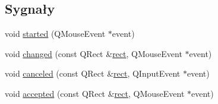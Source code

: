 \subsection*{Sygnały}
\begin{DoxyCompactItemize}
\item 
void \hyperlink{class_q_c_p_selection_rect_a7b7162d19f4f2174d3644ff1a5d335aa}{started} (Q\+Mouse\+Event $\ast$event)
\item 
void \hyperlink{class_q_c_p_selection_rect_a1bab11026bca52740c2e6682623e6964}{changed} (const Q\+Rect \&\hyperlink{class_q_c_p_selection_rect_a426d8186b04c264eb97c0713431f42fa}{rect}, Q\+Mouse\+Event $\ast$event)
\item 
void \hyperlink{class_q_c_p_selection_rect_aeb82009393c90130102dccf36477b906}{canceled} (const Q\+Rect \&\hyperlink{class_q_c_p_selection_rect_a426d8186b04c264eb97c0713431f42fa}{rect}, Q\+Input\+Event $\ast$event)
\item 
void \hyperlink{class_q_c_p_selection_rect_a15a43542e1f7b953a44c260b419e6d2c}{accepted} (const Q\+Rect \&\hyperlink{class_q_c_p_selection_rect_a426d8186b04c264eb97c0713431f42fa}{rect}, Q\+Mouse\+Event $\ast$event)
\end{DoxyCompactItemize}

